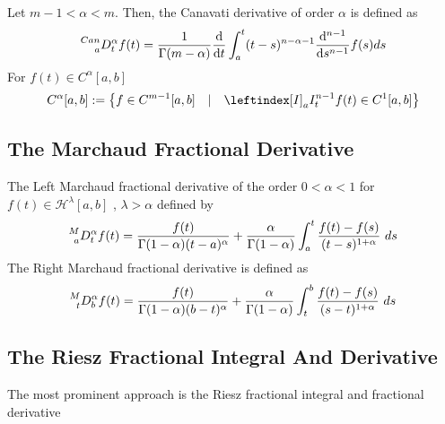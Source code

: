 Let $m-1 < \alpha < m$. Then,
the Canavati derivative of order $\alpha$ is defined as
\[
    \prescript{Can}{a}{D_{t}^{\alpha}} f(t) = \frac{1}{\Gamma(m-\alpha)}\dv{}{t}\int_{a}^{t} (t-s)^{n-\alpha-1} \dv[n-1]{}{s}f(s)ds
\]
For $f(t) \in C^\alpha[a,b]$
\[
    C^\alpha[a,b] := \left\{ f \in C^{m-1}[a,b] \quad | \quad \leftindex[I]_a {I_{t}^{n-1}} f(t) \in C^{1}[a,b] \right\}
\]
\subsection{The Marchaud Fractional Derivative}
The Left Marchaud fractional derivative of the order $0 < \alpha < 1$ for $f(t) \in \mathcal{H}^\lambda[a,b] $ , 
$\lambda>\alpha$ defined by
\[
    \prescript{M}{a}{D_{t}^{\alpha}} f(t) = \frac{f(t)}{\Gamma(1-\alpha)(t-a)^\alpha} 
    + \frac{\alpha}{\Gamma(1-\alpha)} \int_{a}^{t} \frac{f(t) - f(s)}{(t-s)^{1+\alpha}} \,\, ds
\]
The Right Marchaud fractional derivative is defined as
\[
    \prescript{M}{t}{D_{b}^{\alpha}} f(t) = \frac{f(t)}{\Gamma(1-\alpha)(b-t)^\alpha} 
    + \frac{\alpha}{\Gamma(1-\alpha)} \int_{t}^{b} \frac{f(t) - f(s)}{(s-t)^{1+\alpha}} \,\, ds
\]
\newpage
\subsection{The Riesz Fractional Integral And Derivative}
The most prominent approach is the Riesz fractional integral and fractional derivative

